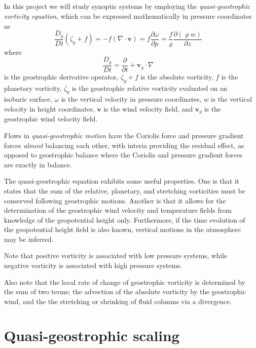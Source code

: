 \documentclass[11pt]{article}
\title{\spacedlowsmallcaps{\small 12.818: Introduction to Atmospheric Data and Large-scale Dynamics}\\ \spacedlowsmallcaps{\large Project seven: The Quasi-geostrophic Vorticity Equation}}
\author{\spacedlowsmallcaps{Ali Ramadhan}}
\date{}
\newcommand\p[2]{\frac{\partial #1}{\partial #2}}
\begin{document}
\maketitle

In this project we will study synoptic systems by employing the \emph{quasi-geostrophic vorticity equation}, which can be expressed mathematically in pressure coordinates as
\begin{equation*}
  \frac{D_g}{Dt}(\zeta_g + f) = -f (\nabla \cdot \bm{v}) = f\p{\omega}{p}
  = \frac{f}{\varrho} \p{(\varrho w)}{z}
\end{equation*}
where
\begin{equation*}
  \frac{D_g}{Dt} = \frac{\partial}{\partial t} + \bm{v}_g \cdot \nabla
\end{equation*}
is the geostrophic derivative operator, $\zeta_g + f$ is the absolute vorticity, $f$ is the planetary vorticity, $\zeta_g$ is the geostrophic relative vorticity evaluated on an isobaric surface, $\omega$ is the vertical velocity in pressure coordinates, $w$ is the vertical velocity in height coordinates, $\bm{v}$ is the wind velocity field, and $\bm{v}_g$ is the geostrophic wind velocity field.

Flows in \emph{quasi-geostrophic motion} have the Coriolis force and pressure  gradient forces \emph{almost} balancing each other, with interia providing the residual effect, as opposed to geostrophic balance where the Coriolis and pressure gradient forces are exactly in balance.

The quasi-geostrophic equation exhibits some useful properties. One is that it states that the sum of the relative, planetary, and stretching vorticities must be conserved following geostrophic motions. Another is that it allows for the determination of the geostrophic wind velocity and temperature fields from knowledge of the geopotential height only. Furthermore, if the time evolution of the geopotential height field is also known, vertical motions in the atmosphere may be inferred.

Note that positive vorticity is associated with low pressure systems, while negative vorticity is associated with high pressure systems.

Also note that the local rate of change of geostrophic vorticity is determined by the sum of two terms; the advection of the absolute vorticity by the geostrophic wind, and the the stretching or shrinking of fluid columns via a  divergence.

\section{Quasi-geostrophic scaling}
\end{document}
